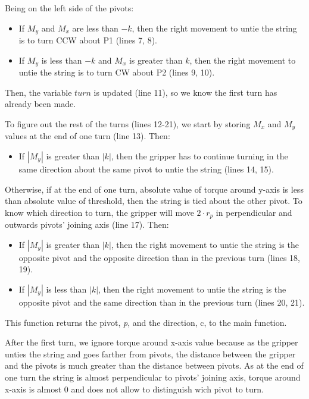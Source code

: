 Being on the left side of the pivots:
\begin{itemize}
	\item If $M_{y}$ and  $M_{x}$ are less than $-k$, then the right movement to untie the string is to turn CCW about P1 (lines 7, 8).
	\item If $M_{y}$ is less than $-k$ and $M_{x}$ is greater than $k$, then the right movement to untie the string is to turn CW about P2 (lines 9, 10).
\end{itemize}

Then, the variable $turn$ is updated (line 11), so we know the first turn has already been made.

To figure out the rest of the turns (lines 12-21), we start by storing $M_{x}$ and $M_{y}$ values at the end of one turn (line 13). Then:

\begin{itemize}
	\item If $|M_{y}|$ is greater than $|k|$, then the gripper has to continue turning in the same direction about the same pivot to untie the string (lines 14, 15).
\end{itemize}

Otherwise, if at the end of one turn, absolute value of torque around y-axis is less than absolute value of threshold, then the string is tied about the other pivot. To know which direction to turn, the gripper will move $2 \cdot r_{p}$ in perpendicular and outwards pivots' joining axis (line 17). Then:
\begin{itemize}
	\item If $|M_{y}|$ is greater than $|k|$, then the right movement to untie the string is the opposite pivot and the opposite direction than in the previous turn (lines 18, 19).
	\item If $|M_{y}|$ is less than $|k|$, then the right movement to untie the string is the opposite pivot and the same direction than in the previous turn (lines 20, 21).
\end{itemize}

This function returns the pivot, \textit{p}, and the direction, {c}, to the main function.

After the first turn, we ignore torque around x-axis value because as the gripper unties the string and goes farther from pivots, the distance between the gripper and the pivots is much greater than the distance between pivots. As at the end of one turn the string is almost perpendicular to pivots' joining axis, torque around x-axis is almost 0 and does not allow to distinguish wich pivot to turn.

